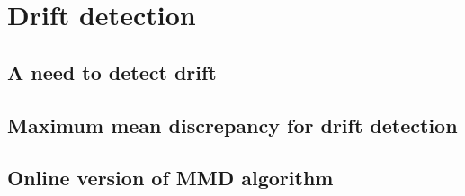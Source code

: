 \section{Drift detection}
    \subsection{A need to detect drift}
    \subsection{Maximum mean discrepancy for drift detection}
        
    \subsection{Online version of MMD algorithm}
            